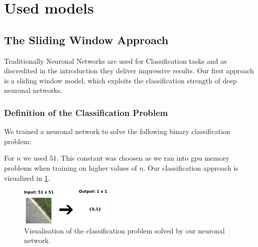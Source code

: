 
\section{Used models}\label{sec:model}

\subsection{The Sliding Window Approach}

Traditionally Neuronal Networks are used for Classification tasks and as discredited in the introduction they deliver impressive results. Our first approach is a sliding window model, which exploits the classification strength of deep neuronal networks.

\subsubsection{Definition of the Classification Problem}

We trained a neuronal network to solve the following binary classification problem:


For $n$ we used $51$. This constant was choosen as we ran into gpu memory problems when training on higher values of $n$. Our classification approach is visualized in \cref{fig:figure}.

\begin{figure}[H]
	\centering
	\includegraphics[width=0.5\columnwidth]{figures/models/sliding_window.png}
	\caption{Visualisation of the classification problem solved by our neuronal network.}
	\label{fig:figure}
\end{figure}


